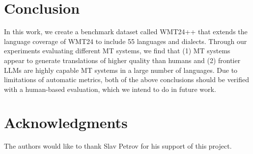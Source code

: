 \section{Conclusion}
In this work, we create a benchmark dataset called WMT24++ that extends the language coverage of WMT24 to include 55 languages and dialects.
Through our experiments evaluating different MT systems, we find that (1) MT systems appear to generate translations of higher quality than humans and (2) frontier LLMs are highly capable MT systems in a large number of languages.
Due to limitations of automatic metrics, both of the above conclusions should be verified with a human-based evaluation, which we intend to do in future work.

\section*{Acknowledgments}
The authors would like to thank Slav Petrov for his support of this project.